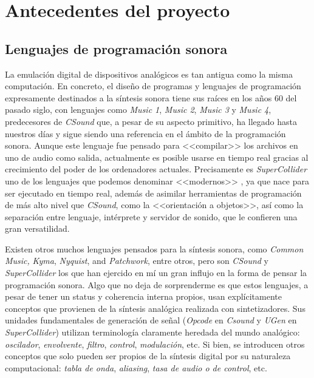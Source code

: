 \chapter[Antecedentes del proyecto]{Antecedentes del proyecto}
\label{ch:antecedentes}

\section{Lenguajes de programación sonora}

La emulación digital de dispositivos analógicos es tan antigua como la misma computación. En concreto, el diseño de programas y lenguajes de programación expresamente destinados a la síntesis sonora tiene sus raíces  en los años 60 del pasado siglo, con lenguajes como \textit{Music 1}, \textit{Music 2}, \textit{Music 3} y \textit{Music 4}, predecesores de \textit{CSound} \cite[~p. xxvii]{Csound_book} que, a pesar de su aspecto primitivo, ha llegado hasta nuestros días y sigue siendo una referencia en el ámbito de la programación sonora. Aunque este lenguaje fue pensado para <<compilar>> los archivos en uno de audio como salida, actualmente es posible usarse en tiempo real gracias al crecimiento del poder de los ordenadores actuales. Precisamente es \textit{SuperCollider} \cite{supercollider} uno de los  lenguajes que podemos denominar <<modernos>> \cite[~p. ix]{SC_book}, ya que nace para ser ejecutado en tiempo real, además de asimilar herramientas de programación de más alto nivel que \textit{CSound}, como la <<orientación a objetos>>, así como la separación entre lenguaje, intérprete y servidor de sonido, que le confieren una gran versatilidad. 




Existen otros muchos lenguajes pensados para la síntesis sonora, como \textit{Common Music,} \textit{Kyma}, \textit{Nyquist}, and \textit{Patchwork}, entre otros, pero son \textit{CSound} y \textit{SuperCollider} los que han ejercido en mí un gran influjo en la forma de pensar la programación sonora. Algo que no deja de sorprenderme es que estos lenguajes, a pesar de tener un status y coherencia interna propios, usan explícitamente conceptos que provienen de la síntesis analógica realizada con sintetizadores. Sus unidades fundamentales de generación de señal (\textit{Opcode} en \textit{Csound} y \textit{UGen} en \textit{SuperCollider}) utilizan terminología claramente heredada del mundo analógico: \textit{oscilador}, \textit{envolvente}, \textit{filtro}, \textit{control}, \textit{modulación}, etc. Si bien, se introducen otros conceptos que solo pueden ser propios de la síntesis digital por su naturaleza computacional: \textit{tabla de onda}, \textit{aliasing}, \textit{tasa de audio o de control}, etc.

